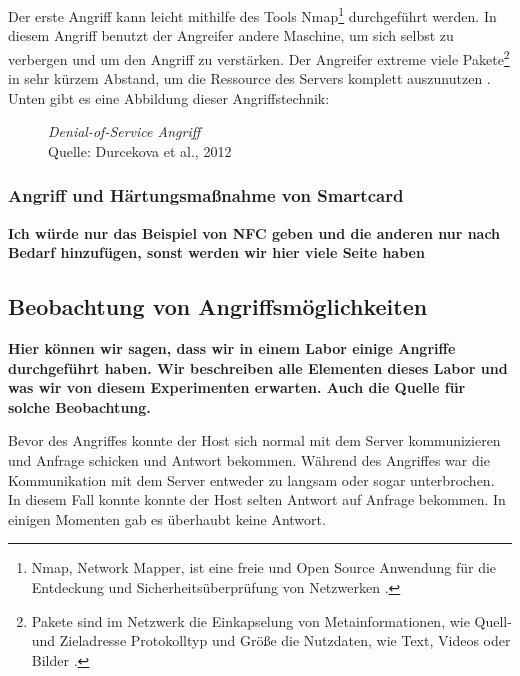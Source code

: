 Der erste Angriff kann leicht mithilfe des Tools Nmap\footnote{Nmap, Network Mapper, ist eine freie und Open Source Anwendung
für die Entdeckung und Sicherheitsüberprüfung von Netzwerken \cite{refst:nmap}.} durchgeführt werden. In diesem Angriff benutzt
der Angreifer andere Maschine, um sich selbst zu verbergen und um den Angriff zu verstärken. Der Angreifer extreme viele
Pakete\footnote{Pakete sind im Netzwerk die Einkapselung von Metainformationen, wie Quell- und Zieladresse Protokolltyp 
und Größe die Nutzdaten, wie Text, Videos oder Bilder \cite{refbook:SWIS}.} in sehr kürzem Abstand, um die Ressource des 
Servers komplett auszunutzen \cite{refip:KSDD}. Unten gibt es eine Abbildung dieser Angriffstechnik:

\begin{figure}[H]
  \caption{\textit{Denial-of-Service Angriff}\\ Quelle: Durcekova et al., 2012}
  \label{fig:VDSD}
\end{figure}

\subsubsection{Angriff und Härtungsmaßnahme von Smartcard}
\textbf{Ich würde nur das Beispiel von NFC geben und die anderen nur nach Bedarf hinzufügen, sonst werden wir hier
viele Seite haben}


\subsection{Beobachtung von Angriffsmöglichkeiten}
\textbf{Hier können wir sagen, dass wir in einem Labor einige Angriffe durchgeführt haben. Wir beschreiben alle Elementen
dieses Labor und was wir von diesem Experimenten erwarten. Auch die Quelle für solche Beobachtung.}

Bevor des Angriffes konnte der Host sich normal mit dem Server kommunizieren und Anfrage schicken und Antwort bekommen.
Während des Angriffes war die Kommunikation mit dem Server entweder zu langsam oder sogar unterbrochen. In diesem Fall
konnte konnte der Host selten Antwort auf Anfrage bekommen. In einigen Momenten gab es überhaubt keine Antwort. 

